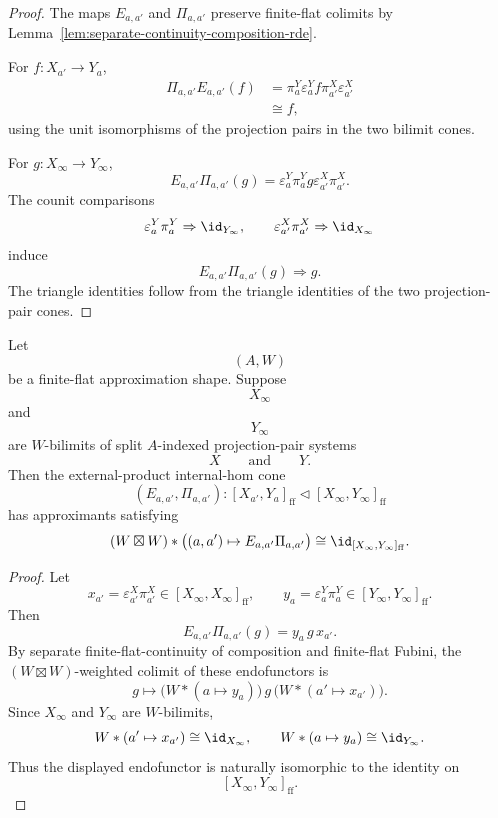 \begin{proof}
The maps \(E_{a,a'}\) and \(\Pi_{a,a'}\) preserve finite-flat colimits by
Lemma~\ref{lem:separate-continuity-composition-rde}.

For \(f:X_{a'}\to Y_a\),
\[
\begin{aligned}
    \Pi_{a,a'}E_{a,a'}(f)
    &=
    \pi_a^Y\varepsilon_a^Y f\pi_{a'}^X\varepsilon_{a'}^X
    \\
    &\cong
    f,
\end{aligned}
\]
using the unit isomorphisms of the projection pairs in the two bilimit cones.

For \(g:X_\infty\to Y_\infty\),
\[
    E_{a,a'}\Pi_{a,a'}(g)
    =
    \varepsilon_a^Y\pi_a^Y g\varepsilon_{a'}^X\pi_{a'}^X.
\]
The counit comparisons
\[
    \varepsilon_a^Y\pi_a^Y\Rightarrow\id_{Y_\infty},
    \qquad
    \varepsilon_{a'}^X\pi_{a'}^X\Rightarrow\id_{X_\infty}
\]
induce
\[
    E_{a,a'}\Pi_{a,a'}(g)\Rightarrow g.
\]
The triangle identities follow from the triangle identities of the two
projection-pair cones.
\end{proof}

\begin{theorem}
\label{thm:external-product-internal-hom-approximation}
Let
\[
    (A,W)
\]
be a finite-flat approximation shape.  Suppose
\[
    X_\infty
\]
and
\[
    Y_\infty
\]
are \(W\)-bilimits of split \(A\)-indexed projection-pair systems
\[
    X
    \qquad\text{and}\qquad
    Y.
\]
Then the external-product internal-hom cone
\[
    (E_{a,a'},\Pi_{a,a'}):
    [X_{a'},Y_a]_{\mathrm{ff}}
    \triangleleft
    [X_\infty,Y_\infty]_{\mathrm{ff}}
\]
has approximants satisfying
\[
    (W\boxtimes W)*
    \bigl((a,a')\mapsto E_{a,a'}\Pi_{a,a'}\bigr)
    \cong
    \id_{[X_\infty,Y_\infty]_{\mathrm{ff}}}.
\]
\end{theorem}

\begin{proof}
Let
\[
    x_{a'}=\varepsilon_{a'}^X\pi_{a'}^X
    \in [X_\infty,X_\infty]_{\mathrm{ff}},
    \qquad
    y_a=\varepsilon_a^Y\pi_a^Y
    \in [Y_\infty,Y_\infty]_{\mathrm{ff}}.
\]
Then
\[
    E_{a,a'}\Pi_{a,a'}(g)=y_a\,g\,x_{a'}.
\]
By separate finite-flat-continuity of composition and finite-flat Fubini, the
\((W\boxtimes W)\)-weighted colimit of these endofunctors is
\[
    g
    \longmapsto
    \bigl(W*(a\mapsto y_a)\bigr)\,
    g\,
    \bigl(W*(a'\mapsto x_{a'})\bigr).
\]
Since \(X_\infty\) and \(Y_\infty\) are \(W\)-bilimits,
\[
    W*(a'\mapsto x_{a'})
    \cong
    \id_{X_\infty},
    \qquad
    W*(a\mapsto y_a)
    \cong
    \id_{Y_\infty}.
\]
Thus the displayed endofunctor is naturally isomorphic to the identity on
\[
    [X_\infty,Y_\infty]_{\mathrm{ff}}.
\]
\end{proof}

